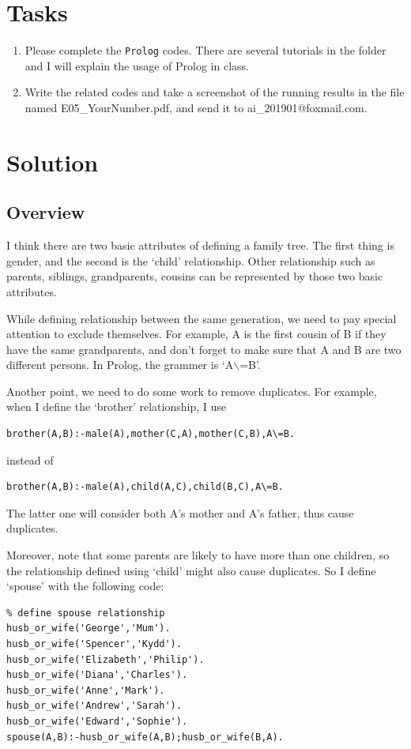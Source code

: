 ﻿\documentclass[a4paper, 11pt]{article}
\begin{document}
\section{Tasks}


\begin{enumerate}
\item Please complete the \texttt{Prolog} codes. There are several tutorials in the folder and I will explain the usage of Prolog in class.
\item Write the related codes and take a screenshot of the running results in the file named \textsf{E05\_YourNumber.pdf}, and send it to \textsf{ai\_201901@foxmail.com}.

\end{enumerate}
\section{Solution}
\subsection{Overview}
I think there are two basic attributes of defining a family tree. The first thing is gender, and the second is the `child' relationship. Other relationship such as parents, siblings, grandparents, cousins can be represented by those two basic attributes.

While defining relationship between the same generation, we need to pay special attention to exclude themselves. For example, A is the first cousin of B if they have the same grandparents, and don't forget to make sure that A and B are two different persons. In Prolog, the grammer is `A$\backslash$=B'.

Another point, we need to do some work to remove duplicates. For example, when I define the `brother' relationship, I use
\begin{lstlisting}
brother(A,B):-male(A),mother(C,A),mother(C,B),A\=B.
\end{lstlisting}

instead of
\begin{lstlisting}
brother(A,B):-male(A),child(A,C),child(B,C),A\=B.
\end{lstlisting}

The latter one will consider both A's mother and A's father, thus cause duplicates.

Moreover, note that some parents are likely to have more than one children, so the relationship defined using `child' might also cause duplicates. So I define `spouse' with the following code:
\begin{lstlisting}
% define spouse relationship
husb_or_wife('George','Mum').
husb_or_wife('Spencer','Kydd').
husb_or_wife('Elizabeth','Philip').
husb_or_wife('Diana','Charles').
husb_or_wife('Anne','Mark').
husb_or_wife('Andrew','Sarah').
husb_or_wife('Edward','Sophie').
spouse(A,B):-husb_or_wife(A,B);husb_or_wife(B,A).
\end{lstlisting}
\end{document}
